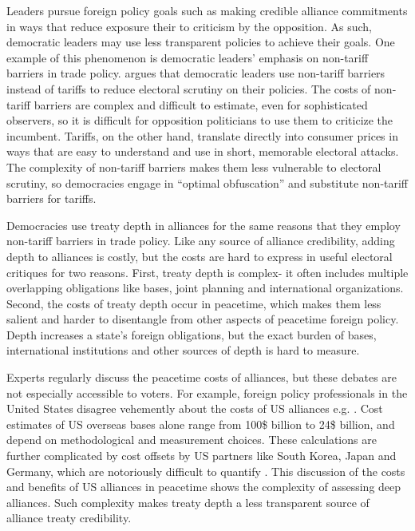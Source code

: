\documentclass[12pt]{article}
\begin{document}
Leaders pursue foreign policy goals such as making credible alliance commitments in ways that reduce exposure their to criticism by the opposition.
As such, democratic leaders may use less transparent policies to achieve their goals.  
One example of this phenomenon is democratic leaders' emphasis on non-tariff barriers in trade policy.
\citet{Kono2006} argues that democratic leaders use non-tariff barriers instead of tariffs to reduce electoral scrutiny on their policies.
The costs of non-tariff barriers are complex and difficult to estimate, even for sophisticated observers, so it is difficult for opposition politicians to use them to criticize the incumbent. 
Tariffs, on the other hand, translate directly into consumer prices in ways that are easy to understand and use in short, memorable electoral attacks.
The complexity of non-tariff barriers makes them less vulnerable to electoral scrutiny, so democracies engage in ``optimal obfuscation'' and substitute non-tariff barriers for tariffs. 


Democracies use treaty depth in alliances for the same reasons that they employ non-tariff barriers in trade policy.
Like any source of alliance credibility, adding depth to alliances is costly, but the costs are hard to express in useful electoral critiques for two reasons.
First, treaty depth is complex- it often includes multiple overlapping obligations like bases, joint planning and international organizations.
Second, the costs of treaty depth occur in peacetime, which makes them less salient and harder to disentangle from other aspects of peacetime foreign policy. 
Depth increases a state's foreign obligations, but the exact burden of bases, international institutions and other sources of depth is hard to measure. 


Experts regularly discuss the peacetime costs of alliances, but these debates are not especially accessible to voters. 
For example, foreign policy professionals in the United States disagree vehemently about the costs of US alliances e.g. \citep{Brooksetal2013, Posen2014, BrandsFeaver2017}.
Cost estimates of US overseas bases alone range from 100\$ billion \citep{Vine2015} to 24\$ billion, and depend on methodological and measurement choices. 
These calculations are further complicated by cost offsets by US partners like South Korea, Japan and Germany, which are notoriously difficult to quantify \citep{Lostumboetal2013}.  
This discussion of the costs and benefits of US alliances in peacetime shows the complexity of assessing deep alliances. 
Such complexity makes treaty depth a less transparent source of alliance treaty credibility. 
\end{document}

